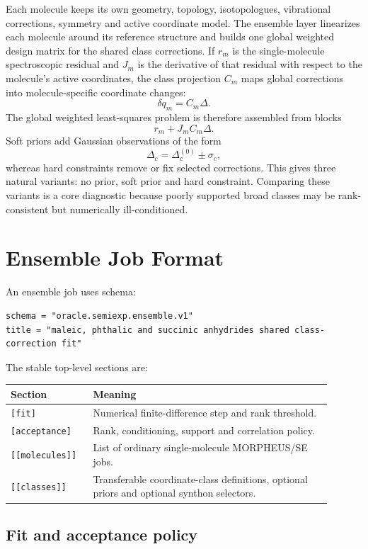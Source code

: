 \documentclass[11pt]{article}
\begin{document}
Each molecule keeps its own geometry, topology, isotopologues, vibrational
corrections, symmetry and active coordinate model.  The ensemble layer
linearizes each molecule around its reference structure and builds one global
weighted design matrix for the shared class corrections.  If \(r_m\) is the
single-molecule spectroscopic residual and \(J_m\) is the derivative of that
residual with respect to the molecule's active coordinates, the class
projection \(C_m\) maps global corrections into molecule-specific coordinate
changes:
\[
  \delta q_m = C_m \Delta .
\]
The global weighted least-squares problem is therefore assembled from blocks
\[
  r_m + J_m C_m \Delta .
\]
Soft priors add Gaussian observations of the form
\[
  \Delta_c = \Delta_c^{(0)} \pm \sigma_c ,
\]
whereas hard constraints remove or fix selected corrections.  This gives three
natural variants: no prior, soft prior and hard constraint.  Comparing these
variants is a core diagnostic because poorly supported broad classes may be
rank-consistent but numerically ill-conditioned.

\section{Ensemble Job Format}

An ensemble job uses schema:

\begin{lstlisting}[style=oracle]
schema = "oracle.semiexp.ensemble.v1"
title = "maleic, phthalic and succinic anhydrides shared class-correction fit"
\end{lstlisting}

\noindent
The stable top-level sections are:

\begin{longtable}{@{}p{0.22\linewidth}p{0.68\linewidth}@{}}
\toprule
Section & Meaning \\
\midrule
\endhead
\texttt{[fit]} & Numerical finite-difference step and rank threshold. \\
\texttt{[acceptance]} & Rank, conditioning, support and correlation policy. \\
\texttt{[[molecules]]} & List of ordinary single-molecule MORPHEUS/SE jobs. \\
\texttt{[[classes]]} & Transferable coordinate-class definitions, optional
priors and optional synthon selectors. \\
\bottomrule
\end{longtable}

\subsection{Fit and acceptance policy}
\end{document}
